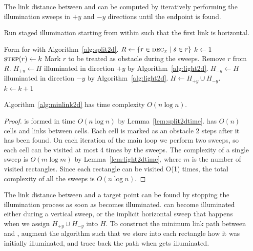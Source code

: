\documentclass[english,gradu]{tktltiki2018}
\begin{document}
The link distance between \spt and \ept can be computed by iteratively performing the illumination sweeps in $+y$ and $-y$ directions until the endpoint is found.

\begin{alg}\label{alg:minlink2d}
Run staged illumination starting from \spt within \fspace such that the first link is horizontal.
\begin{algorithmic}
\State Form  for \fspace with Algorithm~\ref{alg:split2d}.
\State $R\gets\left\{r\in\textsc{dec}_{x} \mid \dot{s}\in r\right\}$
\State $k\gets 1$
			\State $\textsc{step}{(r)}\gets k$
			\State Mark $r$ to be treated as obstacle during the sweeps.
			\State Remove $r$ from $R$.
		\EndIf
	\EndFor
	\State $H_{+y}\gets H$ illuminated in direction $+y$ by Algorithm~\ref{alg:light2d}.
	\State $H_{-y}\gets H$ illuminated in direction $-y$ by Algorithm~\ref{alg:light2d}.
	\State $H\gets H_{+y}\cup H_{-y}$.
	\State $k\gets k+1$
\EndWhile
\end{algorithmic}
\end{alg}

\begin{theo}Algorithm~\ref{alg:minlink2d} has time complexity $O(n\log n)$.\end{theo}
\begin{proof}
 is formed in time $O(n\log n)$ by Lemma~\ref{lem:split2dtime}.
 has $O(n)$ cells and links between cells.
Each cell is marked as an obstacle 2 steps after it has been found.
On each iteration of the main loop we perform two sweeps, so each cell can be visited at most 4 times by the sweeps.
The complexity of a single sweep is $O(m\log m)$ by Lemma~\ref{lem:light2dtime}, where $m$ is the number of visited rectangles.
Since each rectangle can be visited O(1) times, the total complexity of all the sweeps is $O(n\log n)$.
\end{proof}

The link distance between \spt and a target point \ept can be found by stopping the illumination process as soon as \ept becomes illuminated.
\epts can become illuminated either during a vertical sweep, or the implicit horizontal sweep that happens when we assign $H_{+y}\cup H_{-y}$ into $H$.
To construct the minimum link path between \spt and \ept, augment the algorithm such that we store into each rectangle how it was initially illuminated, and trace back the path when \ept gets illuminated.
\end{document}

